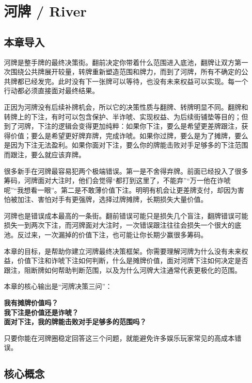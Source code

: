 \chapter{河牌 / River}

\section{本章导入}

河牌是整手牌的最终决策街。翻前决定你带着什么范围进入底池，翻牌让双方第一次围绕公共牌展开较量，转牌重新塑造范围和牌力，而到了河牌，所有不确定的公共牌都已经发完。此时没有下一张牌可以等待，也没有未来权益可以实现。每一个行动都必须直接面对最终结果。

正因为河牌没有后续补牌机会，所以它的决策性质与翻牌、转牌明显不同。翻牌和转牌上的下注，有时可以包含保护、半诈唬、实现权益、为后续街铺垫等目的；但到了河牌，下注的逻辑会变得更加纯粹：如果你下注，要么是希望更差牌跟注，获得价值；要么是希望更好牌弃牌，完成诈唬。如果你过牌，要么是为了摊牌，要么是因为下注无法盈利。如果你面对下注，要么你的牌能击败对手足够多的下注范围而跟注，要么就应该弃牌。

很多新手在河牌最容易犯两个极端错误。第一是不舍得弃牌。前面已经投入了很多筹码，河牌面对大注时，他们会觉得“都打到这里了，不能弃”“万一他在诈唬呢”“我想看一眼”。第二是不敢薄价值下注。明明有机会让更差牌支付，却因为害怕被加注、害怕对手有更强牌，选择过牌摊牌，长期损失大量价值。

河牌也是错误成本最高的一条街。翻前错误可能只是损失几个盲注，翻牌错误可能损失一到两次下注，而河牌面对大注时，一次错误跟注往往会损失一个很大的底池。反过来，一次漏掉的价值下注，也可能让你长期少赢很多筹码。

本章的目标，是帮助你建立河牌最终决策框架。你需要理解河牌为什么没有未来权益，价值下注和诈唬下注如何判断，什么是摊牌价值，面对河牌下注如何决定是否跟注，阻断牌如何帮助判断范围，以及为什么河牌大注通常代表更极化的范围。

本章的核心输出是“河牌决策三问”：

\begin{center}
\textbf{我有摊牌价值吗？\\
我下注是价值还是诈唬？\\
面对下注，我的牌能击败对手足够多的范围吗？}
\end{center}

只要你能在河牌圈稳定回答这三个问题，就能避免许多娱乐玩家常见的高成本错误。

\section{核心概念}

